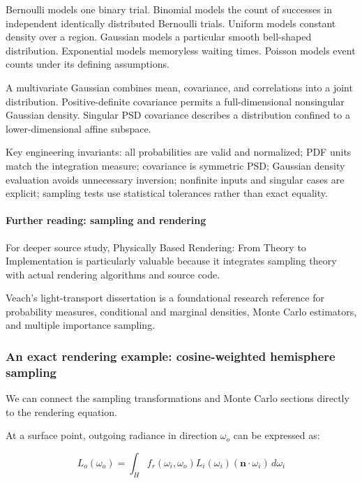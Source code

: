 Bernoulli models one binary trial. Binomial models the count of successes in independent identically distributed Bernoulli trials. Uniform models constant density over a region. Gaussian models a particular smooth bell-shaped distribution. Exponential models memoryless waiting times. Poisson models event counts under its defining assumptions.

A multivariate Gaussian combines mean, covariance, and correlations into a joint distribution. Positive-definite covariance permits a full-dimensional nonsingular Gaussian density. Singular PSD covariance describes a distribution confined to a lower-dimensional affine subspace.

Key engineering invariants: all probabilities are valid and normalized; PDF units match the integration measure; covariance is symmetric PSD; Gaussian density evaluation avoids unnecessary inversion; nonfinite inputs and singular cases are explicit; sampling tests use statistical tolerances rather than exact equality.

\paragraph{Further reading: sampling and rendering}\label{further-reading-sampling-and-rendering}

For deeper source study, Physically Based Rendering: From Theory to Implementation is particularly valuable because it integrates sampling theory with actual rendering algorithms and source code.

Veach's light-transport dissertation is a foundational research reference for probability measures, conditional and marginal densities, Monte Carlo estimators, and multiple importance sampling.

\subsubsection{An exact rendering example: cosine-weighted hemisphere sampling}\label{an-exact-rendering-example-cosine-weighted-hemisphere-sampling}

We can connect the sampling transformations and Monte Carlo sections directly to the rendering equation.

At a surface point, outgoing radiance in direction \(\omega_o\) can be expressed as:

\[
 \boxed{ L_o(\omega_o) = \int_H f_r(\omega_i,\omega_o) L_i(\omega_i) (\mathbf n\cdot\omega_i)\,d\omega_i }
\]

